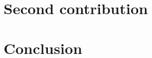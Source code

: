 \documentclass[8pt]{beamer}
\begin{document}
\section{Second contribution}
		
		
		
		
		
		

\section{Conclusion}
		


\frameBibliography
\end{document}
